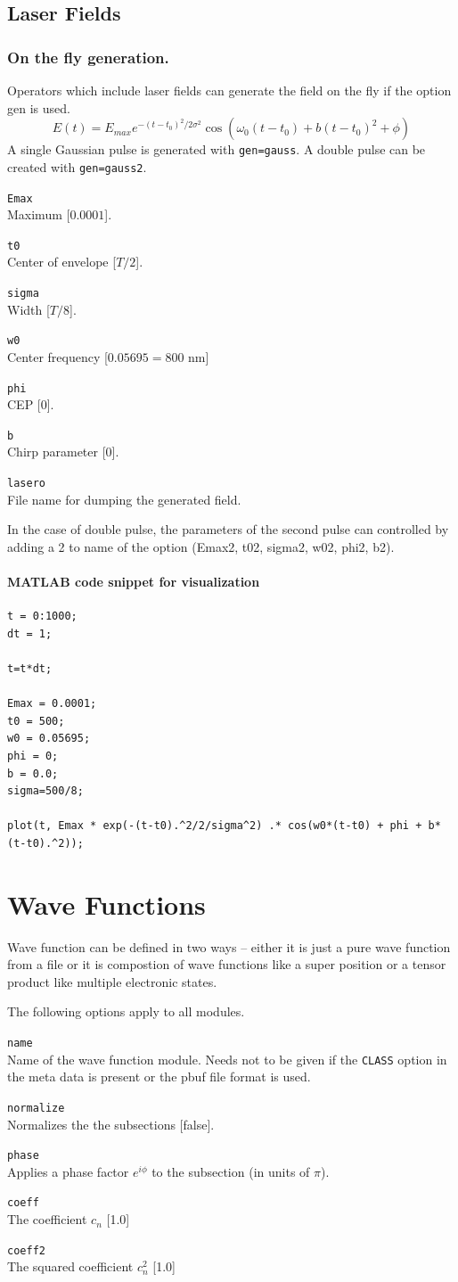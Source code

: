 \documentclass[a4paper,12pt]{scrbook}
\newcommand{\option}[2]{\item \texttt{#1}\\ #2}
\newcommand{\code}[1]{\texttt{#1}}
\begin{document}
\section{Laser Fields}
\label{sec:LaserFields}
\subsection{On the fly generation.}
Operators which include laser fields can generate the field on the fly if the option gen is used.
\begin{equation}
E(t) = E_{max} e^{-(t-t_0)^2/2\sigma^2} \cos(\omega_0 (t-t_0)+ b(t-t_0)^2+\phi)
\end{equation}
A single Gaussian pulse is generated with \verb|gen=gauss|. A double pulse can be created with
\verb|gen=gauss2|.
\begin{options}
 \option{Emax}{Maximum [$0.0001$].}
 \option{t0}{Center of envelope [$T/2$].}
 \option{sigma}{Width [$T/8$].}
 \option{w0}{Center frequency [$0.05695 = 800$ nm]}
 \option{phi}{CEP [0].}
 \option{b}{Chirp parameter [0].}
 \option{lasero}{File name for dumping the generated field.}
\end{options}
In the case of double pulse, the parameters of the second pulse can controlled by adding a 2 to
name of the option (Emax2, t02, sigma2, w02, phi2, b2).

\subsubsection*{MATLAB code snippet for visualization}
\begin{verbatim}
t = 0:1000;
dt = 1;

t=t*dt;

Emax = 0.0001;
t0 = 500;
w0 = 0.05695;
phi = 0;
b = 0.0;
sigma=500/8;

plot(t, Emax * exp(-(t-t0).^2/2/sigma^2) .* cos(w0*(t-t0) + phi + b*(t-t0).^2));
\end{verbatim}


\chapter{Wave Functions}
Wave function can be defined in two ways -- either it is just a pure wave function from a
file or it is compostion of wave functions like a super position or a tensor product like
multiple electronic states.

The following options apply to all modules.
\begin{options}
 \option{name}{Name of the wave function module. Needs not to be given if the \code{CLASS} option in the meta data is present or the pbuf file format is used.}
 \option{normalize}{Normalizes the the subsections [false].}
 \option{phase}{Applies a phase factor $e^{i\phi}$ to the subsection (in units of $\pi$).}
 \option{coeff}{The coefficient $c_n$ [1.0]}
 \option{coeff2}{The squared coefficient $c^2_n$ [1.0]}
\end{options}
\end{document}
